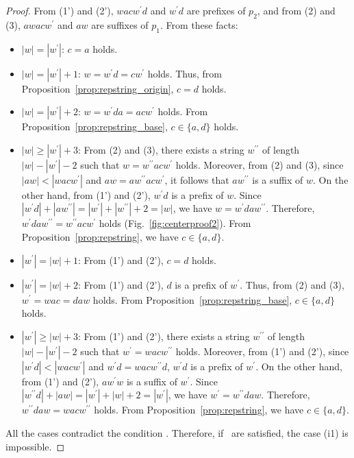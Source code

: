 \begin{proof}
From (1') and (2'), $wacw^{\prime}d$ and $w^{\prime}d$ are prefixes of $p_{2}$, and from (2) and (3), $awacw^{\prime}$ and $aw$ are suffixes of $p_{1}$.
  From these facts:
  \begin{itemize}
  \item $|w|=|w^{\prime}|$: $c = a$ holds.
  \item $|w|=|w^{\prime}|+1$: $w = w^{\prime}d = cw^{\prime}$ holds. Thus, from Proposition~\ref{prop:repstring_origin}, $c = d$ holds.
  \item $|w| = |w^{\prime}|+2$: $w = w^{\prime}da = acw^{\prime}$ holds. From Proposition~\ref{prop:repstring_base},  $c \in \{a, d\}$ holds.
  \item $|w| \ge |w^{\prime}|+3$: From (2) and (3), there exists a string $w^{\prime\prime}$ of length $|w|-|w^{\prime}|-2$ such that $w=w^{\prime\prime}acw^{\prime}$ holds.
  Moreover, from (2) and (3), since $|aw| < |wacw^{\prime}|$ and $aw = aw^{\prime\prime}acw^{\prime}$, it follows that $aw^{\prime\prime}$ is a suffix of $w$.
  On the other hand, from (1') and (2'), $w^{\prime}d$ is a prefix of $w$.
  Since $|w^{\prime}d| + |aw^{\prime\prime}| = |w^{\prime}| + |w^{\prime\prime}| + 2 = |w|$, we have $w=w^{\prime}daw^{\prime\prime}$.
  Therefore, $w^{\prime}daw^{\prime\prime} = w^{\prime\prime}acw^{\prime}$ holds (Fig.~\ref{fig:centerproof2}).
  From Proposition~\ref{prop:repstring}, we have $c \in \{a, d\}$.
  \item $|w^{\prime}|=|w|+1$: From (1') and (2'), $c = d$ holds.
  \item $|w^{\prime}| = |w|+2$: From (1') and (2'), $d$ is a prefix of $w^{\prime}$. Thus, from (2) and (3), $w^{\prime} = wac = daw$ holds. From Proposition~\ref{prop:repstring_base}, $c \in \{a, d\}$ holds.
 \item $|w^{\prime}| \ge |w|+3$: From (1') and (2'), there exists a string $w^{\prime\prime}$ of length $|w|-|w^{\prime}|-2$ such that $w^{\prime}=wacw^{\prime\prime}$ holds.
  Moreover, from (1') and (2'), since $|w^{\prime}d| < |wacw^{\prime}|$ and $w^{\prime}d = wacw^{\prime\prime}d$, $w^{\prime}d$ is a prefix of $w^{\prime}$.
  On the other hand, from (1') and (2'), $aw^{\prime}w$ is a suffix of $w^{\prime}$.
  Since $|w^{\prime\prime}d| + |aw| = |w^{\prime}| + |w| + 2 = |w^{\prime}|$, we have $w^{\prime}=w^{\prime\prime}daw$.
  Therefore, $w^{\prime\prime}daw = wacw^{\prime\prime}$ holds.
  From Proposition~\ref{prop:repstring}, we have $c \in \{a, d\}$.
  \end{itemize}
  All the cases contradict the condition \TheConditionBsub.
  Therefore, if \TheConditionB\ are satisfied, the case (i1) is impossible.


\end{proof}
